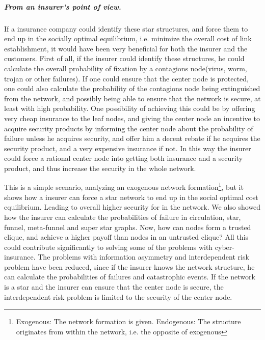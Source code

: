 \subparagraph{From an insurer's point of view.}
If a insurance company could identify these star structures, and force them to end up in the socially optimal equilibrium, i.e. minimize the overall cost of link establishment, it would have been very beneficial for both the insurer and the customers.
First of all, if the insurer could identify these structures, he could calculate the overall probability of fixation by a contagions node(virus, worm, trojan or other failures). If one could ensure that the center node is protected, one could also calculate the probability of the contagions node being extinguished from the network, and possibly being able to ensure that the network is secure, at least with high probability. 
One possibility of achieving this could be by offering very cheap insurance to the leaf nodes, and giving the center node an incentive to acquire security products by informing the center node about the probability of failure unless he acquires security, and offer him a decent rebate if he acquires the security product, and a very expensive insurance if not. In this way the insurer could force a rational center node into getting both insurance and a security product, and thus increase the security in the whole network.

This is a simple scenario, analyzing an exogenous network formation\footnote{Exogenous: The network formation is given. Endogenous: The structure originates from within the network, i.e. the opposite of exogenous}, 
but it shows how a insurer can force a star network to end up in the social optimal cost equilibrium. Leading to overall higher security for in the network. We also showed how the insurer can calculate the probabilities of failure in circulation, star, funnel, meta-funnel and super star graphs.  Now, how can nodes form a trusted clique, and achieve a higher payoff than nodes in an untrusted clique? 
All this could contribute significantly to solving some of the problems with cyber-insurance. The problems with information asymmetry and interdependent risk problem have been reduced, since if the insurer knows the network structure, he can calculate the probabilities of failures and catastrophic events. If the network is a star and the insurer can ensure that the center node is secure, the interdependent risk problem is limited to the security of the center node. 

